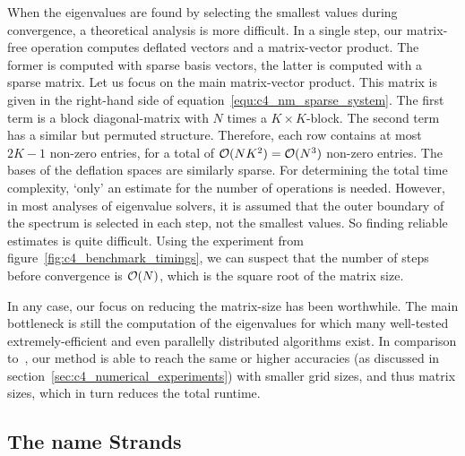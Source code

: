 When the eigenvalues are found by selecting the smallest values during convergence, a theoretical analysis is more difficult. In a single step, our matrix-free operation computes deflated vectors and a matrix-vector product. The former is computed with sparse basis vectors, the latter is computed with a sparse matrix. Let us focus on the main matrix-vector product. This matrix is given in the right-hand side of equation~\eqref{equ:c4_nm_sparse_system}. The first term is a block diagonal-matrix with $N$ times a $K\times K$-block. The second term has a similar but permuted structure. Therefore, each row contains at most $2K - 1$ non-zero entries, for a total of $\operatorname{\mathcal{O}}(N K^2) = \operatorname{\mathcal{O}}(N^3)$ non-zero entries. The bases of the deflation spaces are similarly sparse. For determining the total time complexity, `only' an estimate for the number of operations is needed. However, in most analyses of eigenvalue solvers, it is assumed that the outer boundary of the spectrum is selected in each step, not the smallest values. So finding reliable estimates is quite difficult. Using the experiment from figure~\ref{fig:c4_benchmark_timings}, we can suspect that the number of steps before convergence is $\operatorname{\mathcal{O}}(N)$, which is the square root of the matrix size.

In any case, our focus on reducing the matrix-size has been worthwhile. The main bottleneck is still the computation of the eigenvalues for which many well-tested extremely-efficient and even parallelly distributed algorithms exist. In comparison to~\cite{wang_new_2009}, our method is able to reach the same or higher accuracies (as discussed in section~\ref{sec:c4_numerical_experiments}) with smaller grid sizes, and thus matrix sizes, which in turn reduces the total runtime.

\subsection{The name Strands}

